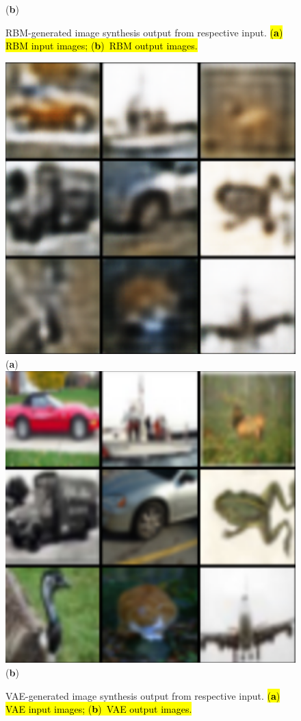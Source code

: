 \documentclass[technologies,article,accept,pdftex,moreauthors]{Definitions/mdpi}
\begin{document}
\begin{figure}[H]
 \text{~~~~~~~~~~~~~~~~~~~~~~~~~~~~~~~~~~~~~~~~~~~~~~~~~~~~~~~~}(\textbf{b}) 
        \label{fig:rbmout} 
    \caption{RBM-generated image synthesis output from respective input. \hl{(\textbf{a}) RBM input images; (\textbf{b})~RBM output images.}%
\label{fig:rbmresults}} 
\end{figure}

\vspace{-9pt}




\begin{figure}[H]
\includegraphics[width=.77\linewidth]{vaein.png}\\
\text{~~~~~~~~~~~~~~~~~~~~~~~~~~~~~~~~~~~~~~~~~~~~~~~~~~~~~~~~}(\textbf{a}) 
        \label{fig:vaein} \\
        \includegraphics[width=.77\linewidth]{vaeout.png}\\
\text{~~~~~~~~~~~~~~~~~~~~~~~~~~~~~~~~~~~~~~~~~~~~~~~~~~~~~~~~}(\textbf{b}) 
        \label{fig:vaeout}  
    \caption{VAE-generated image synthesis output from respective input. \hl{(\textbf{a}) VAE input images; (\textbf{b})~VAE output images.}\label{fig:vaeresults}} %
\end{figure} 
\vspace{-9pt}
\end{document}
